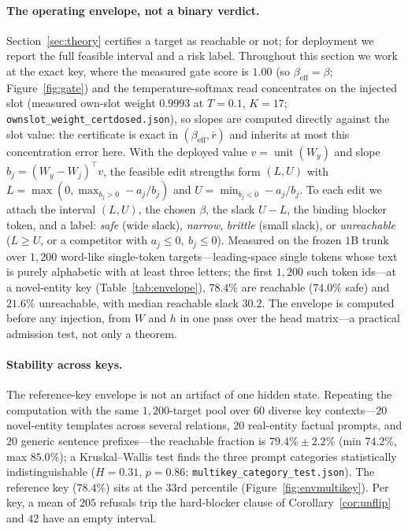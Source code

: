 \documentclass[11pt]{article}
\theoremstyle{remark}
\DeclareMathOperator{\unit}{unit}
\begin{document}
\paragraph{The operating envelope, not a binary verdict.}
Section~\ref{sec:theory} certifies a target as reachable or not; for deployment we
report the full feasible interval and a risk label. Throughout this section we
work at the exact key, where the measured gate score is $1.00$ (so
$\beta_{\mathrm{eff}}=\beta$; Figure~\ref{fig:gate}) and the temperature-softmax
read concentrates on the injected slot (measured own-slot weight $0.9993$ at
$T=0.1$, $K=17$; \texttt{ownslot\_weight\_certdosed.json}), so
slopes are computed directly against the slot value: the certificate is exact in
$(\beta_{\mathrm{eff}},\bar r)$ and inherits at most this concentration error
here. With the deployed value
$v=\unit(W_y)$ and slope $b_j=(W_y-W_j)^{\top}v$, the feasible edit strengths form
$(L,U)$ with $L=\max(0,\max_{b_j>0}-a_j/b_j)$ and $U=\min_{b_j<0}-a_j/b_j$. To each
edit we attach the interval $(L,U)$, the chosen $\beta$, the slack $U-L$, the
binding blocker token, and a label: \emph{safe} (wide slack), \emph{narrow},
\emph{brittle} (small slack), or \emph{unreachable} ($L\ge U$, or a competitor with
$a_j\le0,\ b_j\le0$). Measured on the frozen $1$B trunk over $1{,}200$ word-like
single-token targets---leading-space single tokens whose text is purely
alphabetic with at least three letters; the first $1{,}200$ such token ids---at
a novel-entity key (Table~\ref{tab:envelope}), $78.4\%$ are
reachable ($74.0\%$ safe) and $21.6\%$ unreachable, with median reachable slack
$30.2$. The envelope is computed before any injection, from $W$ and $h$ in one
pass over the head matrix---a practical admission test, not only a theorem.

\paragraph{Stability across keys.}
The reference-key envelope is not an artifact of one hidden state. Repeating the
computation with the same $1{,}200$-target pool over $60$ diverse key
contexts---$20$ novel-entity templates across several relations, $20$ real-entity
factual prompts, and $20$ generic sentence prefixes---the reachable fraction is
$79.4\%\pm2.2\%$ (min $74.2\%$, max $85.0\%$); a Kruskal--Wallis test finds the
three prompt categories statistically indistinguishable ($H=0.31$, $p=0.86$;
\texttt{multikey\_\allowbreak category\_\allowbreak test.json}). The reference
key ($78.4\%$) sits at the $33$rd percentile (Figure~\ref{fig:envmultikey}). Per key, a mean of $205$
refusals trip the hard-blocker clause of Corollary~\ref{cor:unflip} and $42$ have
an empty interval.
\end{document}
